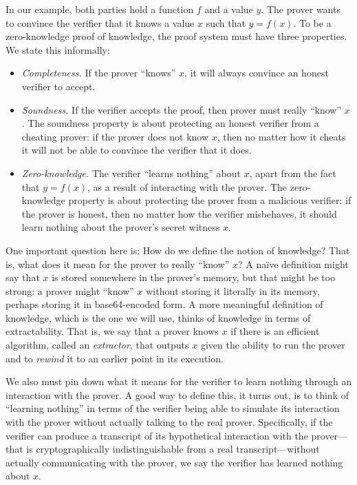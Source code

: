 In our example, both parties hold a function $f$ and a value $y$.
The prover wants to convince the verifier that it knows a value $x$ such that $y=f(x)$.
To be a zero-knowledge proof of knowledge,
the proof system must have three properties.
We state this informally:
\label{sec:zkdefn}
\begin{itemize}
\item \emph{Completeness.} If the prover ``knows'' $x$,
      it will always convince an honest verifier to accept.

\item \emph{Soundness.} If the verifier accepts the
      proof, then prover must really ``know'' $x$.
      The soundness property is about protecting
      an honest verifier from a cheating prover:
      if the prover does not know $x$, then no matter
      how it cheats it will not be able to convince
      the verifier that it does.

\item \emph{Zero-knowledge.} The verifier 
      ``learns nothing'' about $x$, apart from the fact that $y=f(x)$,
      as a result of interacting with the prover.
      The zero-knowledge property is about protecting
      the prover from a malicious verifier: if the prover
      is honest, then no matter how the verifier misbehaves,
      it should learn nothing about the prover's secret witness $x$.
\end{itemize}

One important question here is: How do we define the notion of knowledge?  
That is, what does it mean for the prover to really ``know'' $x$?
A na\"ive definition might say that $x$
is stored somewhere in the prover's memory, but that might be too strong:
a prover might ``know'' $x$ without storing it literally in its memory,
perhaps storing it in base64-encoded form.
A more meaningful definition of knowledge, which is the one we will use,
thinks of knowledge in terms of extractability.
That is, we say that a prover knows $x$ if there is an efficient
algorithm, called an \emph{extractor}, that outputs $x$ given the
ability to run the prover and to \emph{rewind} it to an earlier
point in its execution.

We also must pin down what it means for the verifier to
learn nothing through an interaction with the prover.
A good way to define this, it turns out, is to think of
``learning nothing'' in terms of the verifier being able to simulate its
interaction with the prover without actually talking to the real prover.
Specifically, if the verifier can produce a transcript of its hypothetical
interaction with the prover---that is cryptographically indistinguishable 
from a real transcript---without actually communicating with the
prover, we say the verifier has learned nothing about $x$.

